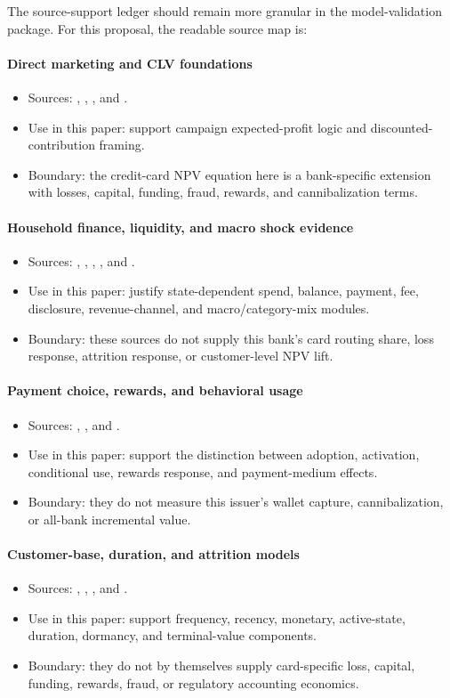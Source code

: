 \documentclass[11pt]{article}
\newcommand{\1}{\mathbf{1}}
\newcommand{\contractitem}[2]{\paragraph{#1}\begin{itemize}[leftmargin=1.5em,itemsep=0.12em,topsep=0.18em]#2\end{itemize}}
\begin{document}
The source-support ledger should remain more granular in the model-validation
package. For this proposal, the readable source map is:

\contractitem{Direct marketing and CLV foundations}{
  \item Sources: \citet{bult1995directmail}, \citet{berger1998clv},
        \citet{rust2004return}, and \citet{venkatesan2004clv}.
  \item Use in this paper: support campaign expected-profit logic and
        discounted-contribution framing.
  \item Boundary: the credit-card NPV equation here is a bank-specific
        extension with losses, capital, funding, fraud, rewards, and
        cannibalization terms.
}
\contractitem{Household finance, liquidity, and macro shock evidence}{
  \item Sources: \citet{ganong2019unemployment},
        \citet{johnson2004rebates}, \citet{gross2001liquidity},
        \citet{agarwal2013cardact}, and \citet{baker2020epidemic}.
  \item Use in this paper: justify state-dependent spend, balance, payment,
        fee, disclosure, revenue-channel, and macro/category-mix modules.
  \item Boundary: these sources do not supply this bank's card routing share,
        loss response, attrition response, or customer-level NPV lift.
}
\contractitem{Payment choice, rewards, and behavioral usage}{
  \item Sources: \citet{koulayev2012payment},
        \citet{agarwal2010rewards}, and \citet{prelec2001creditcard}.
  \item Use in this paper: support the distinction between adoption, activation,
        conditional use, rewards response, and payment-medium effects.
  \item Boundary: they do not measure this issuer's wallet capture,
        cannibalization, or all-bank incremental value.
}
\contractitem{Customer-base, duration, and attrition models}{
  \item Sources: \citet{schmittlein1987counting}, \citet{fader2005bgnbd},
        \citet{fader2005rfm}, and \citet{bolton1998duration}.
  \item Use in this paper: support frequency, recency, monetary, active-state,
        duration, dormancy, and terminal-value components.
  \item Boundary: they do not by themselves supply card-specific loss, capital,
        funding, rewards, fraud, or regulatory accounting economics.
}
\end{document}
